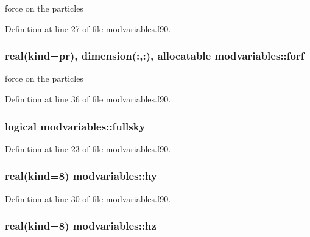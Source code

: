 force on the particles 



Definition at line 27 of file modvariables.\+f90.

\subsubsection[{\texorpdfstring{forf}{forf}}]{\setlength{\rightskip}{0pt plus 5cm}real(kind=pr), dimension(\+:,\+:), allocatable modvariables\+::forf}\hypertarget{namespacemodvariables_a1f2453280a3af1c380a1c3ad4797dc4b}{}\label{namespacemodvariables_a1f2453280a3af1c380a1c3ad4797dc4b}


force on the particles 



Definition at line 36 of file modvariables.\+f90.

\subsubsection[{\texorpdfstring{fullsky}{fullsky}}]{\setlength{\rightskip}{0pt plus 5cm}logical modvariables\+::fullsky}\hypertarget{namespacemodvariables_ace518a722b9c63f8c88c4915aa9a7549}{}\label{namespacemodvariables_ace518a722b9c63f8c88c4915aa9a7549}


Definition at line 23 of file modvariables.\+f90.

\subsubsection[{\texorpdfstring{hy}{hy}}]{\setlength{\rightskip}{0pt plus 5cm}real(kind=8) modvariables\+::hy}\hypertarget{namespacemodvariables_a31a775c0bcadfce141cc3cebf22df9ff}{}\label{namespacemodvariables_a31a775c0bcadfce141cc3cebf22df9ff}


Definition at line 30 of file modvariables.\+f90.

\subsubsection[{\texorpdfstring{hz}{hz}}]{\setlength{\rightskip}{0pt plus 5cm}real(kind=8) modvariables\+::hz}\hypertarget{namespacemodvariables_a26d18952766121089d4309f2449d8b29}{}\label{namespacemodvariables_a26d18952766121089d4309f2449d8b29}


